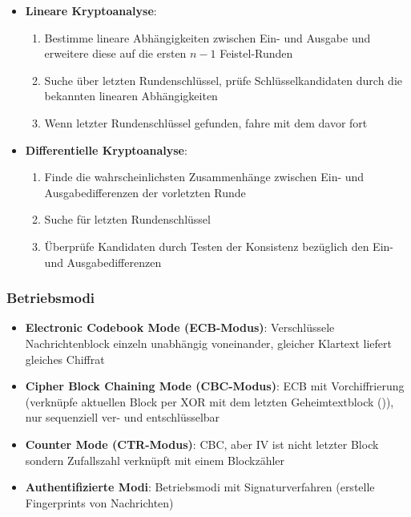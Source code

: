 \begin{itemize}
	\item \textbf{Lineare Kryptoanalyse}:
	\begin{enumerate}
		\item Bestimme lineare Abhängigkeiten zwischen Ein- und Ausgabe und erweitere diese auf die ersten $n - 1$ Feistel-Runden
		\item Suche über letzten Rundenschlüssel, prüfe Schlüsselkandidaten durch die bekannten linearen Abhängigkeiten
		\item Wenn letzter Rundenschlüssel gefunden, fahre mit dem davor fort
	\end{enumerate}
	\item \textbf{Differentielle Kryptoanalyse}:
	\begin{enumerate}
		\item Finde die wahrscheinlichsten Zusammenhänge zwischen Ein- und Ausgabedifferenzen der vorletzten Runde
		\item Suche für letzten Rundenschlüssel
		\item Überprüfe Kandidaten durch Testen der Konsistenz bezüglich den Ein- und Ausgabedifferenzen
	\end{enumerate}
\end{itemize}
	
\subsubsection{Betriebsmodi}%
\label{symver:ssub:betriebsmodi}

\begin{itemize}
	\item \textbf{Electronic Codebook Mode (ECB-Modus)}: Verschlüssele Nachrichtenblock einzeln unabhängig voneinander, gleicher Klartext liefert gleiches Chiffrat
	\item \textbf{Cipher Block Chaining Mode (CBC-Modus)}: ECB mit Vorchiffrierung (verknüpfe aktuellen Block per XOR mit dem letzten Geheimtextblock ()), nur sequenziell ver- und entschlüsselbar
	\item \textbf{Counter Mode (CTR-Modus)}: CBC, aber IV ist nicht letzter Block sondern Zufallszahl verknüpft mit einem Blockzähler
	\item \textbf{Authentifizierte Modi}: Betriebsmodi mit Signaturverfahren (erstelle Fingerprints von Nachrichten)
\end{itemize}